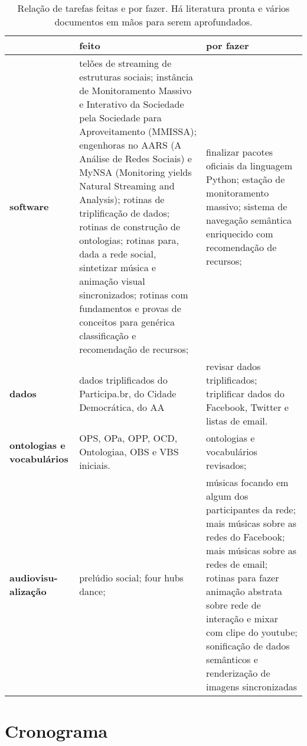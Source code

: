 \documentclass[a4paper,openright,12pt]{report} %
\begin{document}
\begin{table}[!h]
\centering
\footnotesize
\caption{Relação de tarefas feitas e por fazer. Há literatura pronta e vários documentos em mãos para serem aprofundados.}\label{tab:afa}
\begin{tabular}{p{1.3cm}||p{7.6cm}|p{7.1cm}}\hline
	& {\bf feito} & {\bf por fazer} \\\hline
				       {\bf software}     & telões de streaming de estruturas sociais;
				       instância de Monitoramento Massivo e Interativo da Sociedade pela Sociedade para Aproveitamento (MMISSA);
				       engenhoras no AARS (A Análise de Redes Sociais) e MyNSA (Monitoring yields Natural Streaming and Analysis);
				       rotinas de triplificação de dados; rotinas de construção de ontologias;
				       rotinas para, dada a rede social, sintetizar música e animação visual sincronizados;
				       rotinas com fundamentos e provas de conceitos para genérica classificação e recomendação de recursos;
				       & finalizar pacotes oficiais da linguagem Python;
				       estação de monitoramento massivo;
				       sistema de navegação semântica enriquecido com recomendação de recursos;
				       \\\hline
				       {\bf dados}        & dados triplificados do Participa.br, do Cidade Democrática, do AA  & revisar dados triplificados;
				       triplificar dados do Facebook, Twitter e listas de email. \\\hline
				       {\bf ontologias e vocabulários}  & OPS, OPa, OPP, OCD, Ontologiaa, OBS e VBS iniciais.  & ontologias e vocabulários revisados; \\\hline
				       {\bf audiovisu-alização}         & prelúdio social; four hubs dance;   & músicas focando em algum dos participantes da rede; mais músicas sobre as redes do Facebook; mais músicas sobre as redes de email; rotinas para fazer animação abstrata sobre rede de interação e mixar com clipe do youtube;
				       sonificação de dados semânticos e renderização de imagens sincronizadas \\\hline
\end{tabular}
\end{table}








\section{Cronograma}\label{sec:cron}
\end{document}
